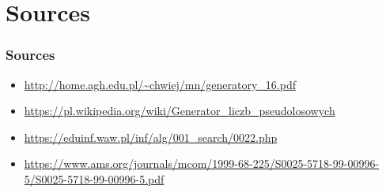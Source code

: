 \documentclass[9pt]{beamer}
\begin{document}
\section{Sources}
\begin{frame}
  \frametitle{Sources}
  \begin{itemize}
    \item \url{http://home.agh.edu.pl/~chwiej/mn/generatory_16.pdf}
    \item \url{https://pl.wikipedia.org/wiki/Generator_liczb_pseudolosowych}
    \item \url{https://eduinf.waw.pl/inf/alg/001_search/0022.php}
    \item \url{https://www.ams.org/journals/mcom/1999-68-225/S0025-5718-99-00996-5/S0025-5718-99-00996-5.pdf}
  \end{itemize}
\end{frame}
\end{document}
